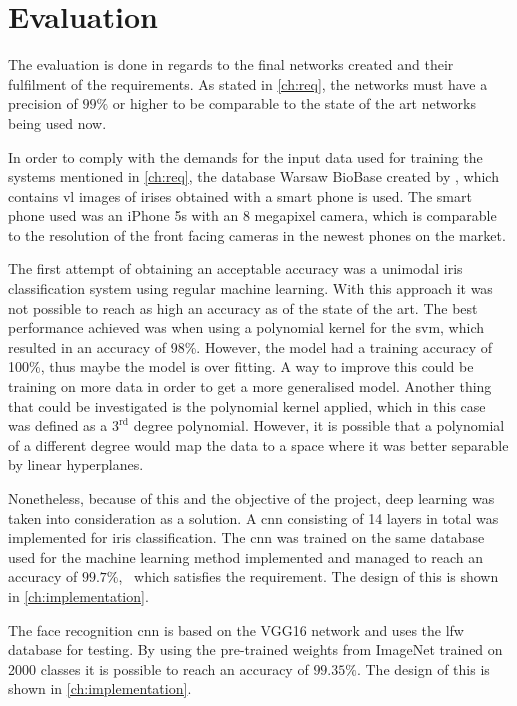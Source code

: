 \chapter{Evaluation}
The evaluation is done in regards to the final networks created and their fulfilment of the requirements. As stated in \autoref{ch:req}, the networks must have a precision of $99\%$ or higher to be comparable to the state of the art networks being used now.

In order to comply with the demands for the input data used for training the systems mentioned in \autoref{ch:req}, the database Warsaw BioBase created by \cite{Trokielewicz2016}, which contains \gls{vl} images of irises obtained with a smart phone is used. The smart phone used was an iPhone 5s with an 8 megapixel camera, which is comparable to the resolution of the front facing cameras in the newest phones on the market. 

The first attempt of obtaining an acceptable accuracy was a unimodal iris classification system using regular machine learning. With this approach it was not possible to reach as high an accuracy as of the state of the art. The best performance achieved was when using a polynomial kernel for the \gls{svm}, which resulted in an accuracy of 98\%. However, the model had a training accuracy of 100\%, thus maybe the model is over fitting. A way to improve this could be training on more data in order to get a more generalised model. Another thing that could be investigated is the polynomial kernel applied, which in this case was defined as a $3^{\text{rd}}$ degree polynomial. However, it is possible that a polynomial of a different degree would map the data to a space where it was better separable by linear hyperplanes. 

Nonetheless, because of this and the objective of the project, deep learning was taken into consideration as a solution. A \gls{cnn} consisting of 14 layers in total was implemented for iris classification. The \gls{cnn} was trained on the same database used for the machine learning method implemented and managed to reach an accuracy of $99.7\%$, ~which satisfies the requirement. The design of this is shown in \autoref{ch:implementation}.

The face recognition \gls{cnn} is based on the VGG16 network and uses the \gls{lfw} database for testing. By using the pre-trained weights from ImageNet trained on 2000 classes it is possible to reach an accuracy of $99.35\%$. The design of this is shown in \autoref{ch:implementation}.	

